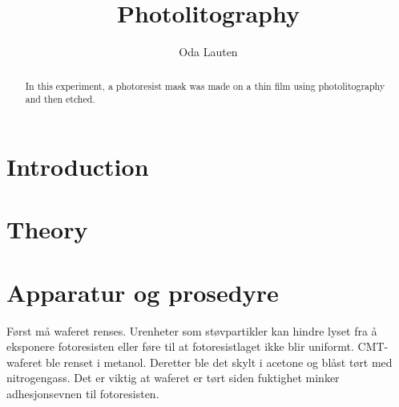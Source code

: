 \documentclass[5p]{elsarticle}    	                %
\begin{document}
\begin{frontmatter}
\title{Photolitography}
\author[fysikk]{Oda Lauten}
\address[fysikk]{Department of Physics, Norwegian University of Science and Technology, N-7491 Trondheim, Norway.}

\begin{abstract}
In this experiment, a photoresist mask was made on a  thin film using photolitography and then etched.


\end{abstract}
\end{frontmatter}
\section{Introduction}


\section{Theory}

\section{Apparatur og prosedyre}
Først må waferet renses. Urenheter som støvpartikler kan hindre lyset fra å eksponere fotoresisten eller føre til at fotoresistlaget ikke blir uniformt. CMT-waferet ble renset i metanol. Deretter ble det skylt i acetone og blåst tørt med nitrogengass. Det er viktig at waferet er tørt siden fuktighet minker adhesjonsevnen til fotoresisten.
\end{document}
